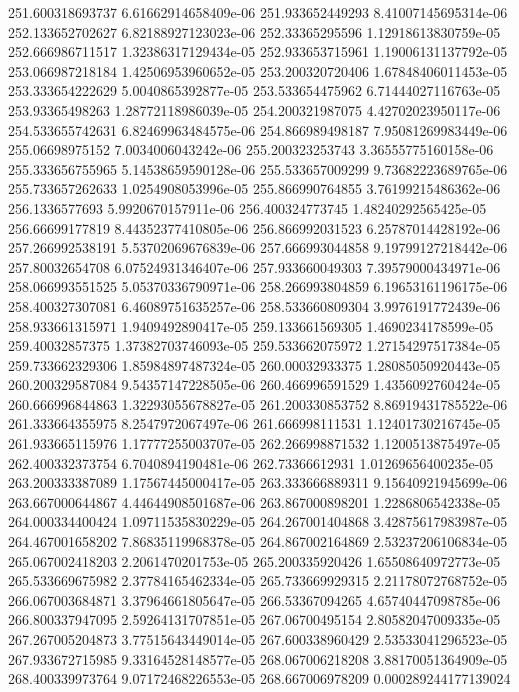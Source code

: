 {251.600318693737 6.61662914658409e-06
251.933652449293 8.41007145695314e-06
252.133652702627 6.82188927123023e-06
252.33365295596 1.12918613830759e-05
252.666986711517 1.32386317129434e-05
252.933653715961 1.19006131137792e-05
253.066987218184 1.42506953960652e-05
253.200320720406 1.67848406011453e-05
253.333654222629 5.0040865392877e-05
253.533654475962 6.71444027116763e-05
253.93365498263 1.28772118986039e-05
254.200321987075 4.42702023950117e-06
254.533655742631 6.82469963484575e-06
254.866989498187 7.95081269983449e-06
255.06698975152 7.0034006043242e-06
255.200323253743 3.36555775160158e-06
255.333656755965 5.14538659590128e-06
255.533657009299 9.73682223689765e-06
255.733657262633 1.0254908053996e-05
255.866990764855 3.76199215486362e-06
256.1336577693 5.9920670157911e-06
256.400324773745 1.48240292565425e-05
256.66699177819 8.44352377410805e-06
256.866992031523 6.25787014428192e-06
257.266992538191 5.53702069676839e-06
257.666993044858 9.19799127218442e-06
257.80032654708 6.07524931346407e-06
257.933660049303 7.39579000434971e-06
258.066993551525 5.05370336790971e-06
258.266993804859 6.19653161196175e-06
258.400327307081 6.46089751635257e-06
258.533660809304 3.9976191772439e-06
258.933661315971 1.9409492890417e-05
259.133661569305 1.4690234178599e-05
259.40032857375 1.37382703746093e-05
259.533662075972 1.27154297517384e-05
259.733662329306 1.85984897487324e-05
260.00032933375 1.28085050920443e-05
260.200329587084 9.54357147228505e-06
260.466996591529 1.4356092760424e-05
260.666996844863 1.32293055678827e-05
261.200330853752 8.86919431785522e-06
261.333664355975 8.2547972067497e-06
261.666998111531 1.12401730216745e-05
261.933665115976 1.17777255003707e-05
262.266998871532 1.1200513875497e-05
262.400332373754 6.7040894190481e-06
262.73366612931 1.01269656400235e-05
263.200333387089 1.17567445000417e-05
263.333666889311 9.15640921945699e-06
263.667000644867 4.44644908501687e-06
263.867000898201 1.2286806542338e-05
264.000334400424 1.09711535830229e-05
264.267001404868 3.42875617983987e-05
264.467001658202 7.86835119968378e-05
264.867002164869 2.53237206106834e-05
265.067002418203 2.2061470201753e-05
265.200335920426 1.65508640972773e-05
265.533669675982 2.37784165462334e-05
265.733669929315 2.21178072768752e-05
266.067003684871 3.37964661805647e-05
266.53367094265 4.65740447098785e-06
266.800337947095 2.59264131707851e-05
267.06700495154 2.80582047009335e-05
267.267005204873 3.77515643449014e-05
267.600338960429 2.53533041296523e-05
267.933672715985 9.33164528148577e-05
268.067006218208 3.88170051364909e-05
268.400339973764 9.07172468226553e-05
268.667006978209 0.000289244177139024
}
